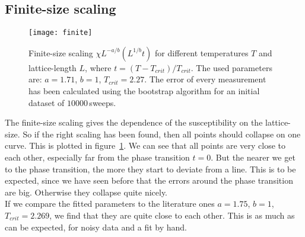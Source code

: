 \subsection{Finite-size scaling}

\begin{figure}
  \centering
  \texttt{[image: finite]}
  \caption{Finite-size scaling $\chi L^{-a/b}(L^{1/b}t)$ for different temperatures $T$ and lattice-length $L$, where $t = (T - T_{crit})/T_{crit}$. The used parameters are: $a = 1.71$, $b = 1$, $T_{crit} = 2.27$. The error of every measurement has been calculated using the bootstrap algorithm for an initial dataset of $10000\,$sweeps.}\label{fig:finite}
\end{figure}

The finite-size scaling gives the dependence of the susceptibility on the lattice-size. So if the right scaling has been found, then all points should collapse on one curve. This is plotted in figure~\ref{fig:finite}. We can see that all points are very close to each other, especially far from the phase transition $t = 0$. But the nearer we get to the phase transition, the more they start to deviate from a line. This is to be expected, since we have seen before that the errors around the phase transition are big. Otherwise they collapse quite nicely.\\
If we compare the fitted parameters to the literature ones $a = 1.75$, $b = 1$, $T_{crit} = 2.269$, we find that they are quite close to each other. This is as much as can be expected, for noisy data and a fit by hand.
